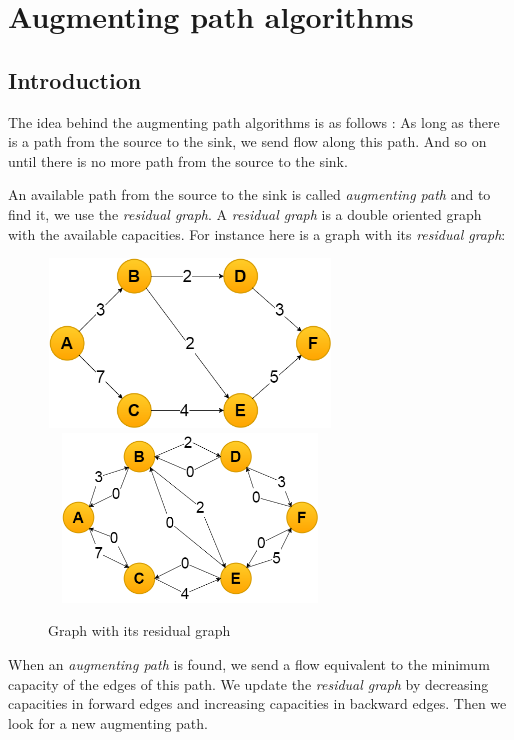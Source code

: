 \section{Augmenting path algorithms}
\subsection{Introduction}
The idea behind the augmenting path algorithms is as follows : 
As long as there is a path from the source to the sink, we send flow along this path. And so on until there is no more path from the source to the sink. \newline

An available path from the source to the sink is called \textit{augmenting path} and to find it, we use the \textit{residual graph}. A \textit{residual graph} is a double oriented graph with the available capacities. For instance here is a graph with its \textit{residual graph}: \newline

\begin{figure}[!h]
\includegraphics[width=7.5cm,height=4.5cm]{images/graph.png}\hfill
\includegraphics[width=7.5cm,height=4.5cm]{images/residualgraph.png}
\caption{Graph with its residual graph}
\end{figure}


When an \textit{augmenting path} is found, we send a flow equivalent to the minimum capacity of the edges of this path. We update the \textit{residual graph} by decreasing capacities in forward edges and increasing capacities in backward edges. Then we look for a new augmenting path. \newline

